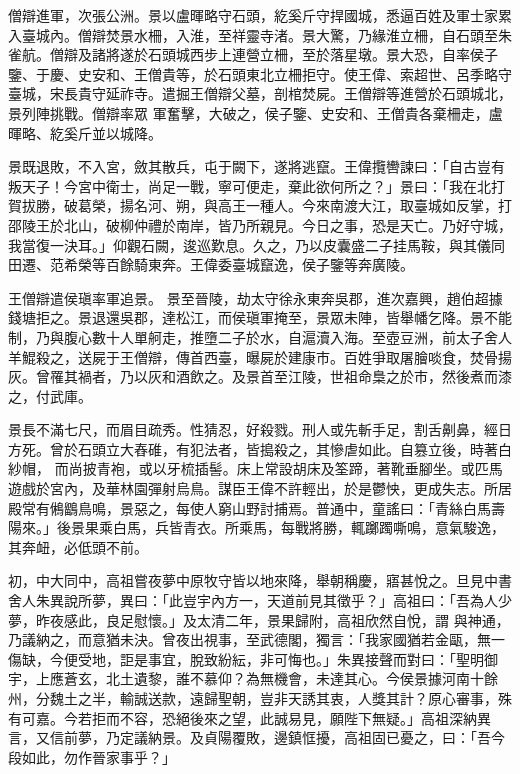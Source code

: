 \begin{pinyinscope}
 僧辯進軍，次張公洲。景以盧暉略守石頭，紇奚斤守捍國城，悉逼百姓及軍士家累入臺城內。僧辯焚景水柵，入淮，至祥靈寺渚。景大驚，乃緣淮立柵，自石頭至朱雀航。僧辯及諸將遂於石頭城西步上連營立柵，至於落星墩。景大恐，自率侯子鑒、于慶、史安和、王僧貴等，於石頭東北立柵拒守。使王偉、索超世、呂季略守臺城，宋長貴守延祚寺。遣掘王僧辯父墓，剖棺焚屍。王僧辯等進營於石頭城北，景列陣挑戰。僧辯率眾
 軍奮擊，大破之，侯子鑒、史安和、王僧貴各棄柵走，盧暉略、紇奚斤並以城降。



 景既退敗，不入宮，斂其散兵，屯于闕下，遂將逃竄。王偉攬轡諫曰：「自古豈有叛天子！今宮中衛士，尚足一戰，寧可便走，棄此欲何所之？」景曰：「我在北打賀拔勝，破葛榮，揚名河、朔，與高王一種人。今來南渡大江，取臺城如反掌，打邵陵王於北山，破柳仲禮於南岸，皆乃所親見。今日之事，恐是天亡。乃好守城，我當復一決耳。」仰觀石闕，逡巡歎息。久之，乃以皮囊盛二子挂馬鞍，與其儀同田遷、范希榮等百餘騎東奔。王偉委臺城竄逸，侯子鑒等奔廣陵。



 王僧辯遣侯瑱率軍追景。
 景至晉陵，劫太守徐永東奔吳郡，進次嘉興，趙伯超據錢塘拒之。景退還吳郡，達松江，而侯瑱軍掩至，景眾未陣，皆舉幡乞降。景不能制，乃與腹心數十人單舸走，推墮二子於水，自滬瀆入海。至壺豆洲，前太子舍人羊鯤殺之，送屍于王僧辯，傳首西臺，曝屍於建康市。百姓爭取屠膾啖食，焚骨揚灰。曾罹其禍者，乃以灰和酒飲之。及景首至江陵，世祖命梟之於市，然後煮而漆之，付武庫。



 景長不滿七尺，而眉目疏秀。性猜忍，好殺戮。刑人或先斬手足，割舌劓鼻，經日方死。曾於石頭立大舂碓，有犯法者，皆搗殺之，其慘虐如此。自篡立後，時著白紗帽，
 而尚披青袍，或以牙梳插髻。床上常設胡床及筌蹄，著靴垂腳坐。或匹馬遊戲於宮內，及華林園彈射烏鳥。謀臣王偉不許輕出，於是鬱怏，更成失志。所居殿常有鵂鶹鳥鳴，景惡之，每使人窮山野討捕焉。普通中，童謠曰：「青絲白馬壽陽來。」後景果乘白馬，兵皆青衣。所乘馬，每戰將勝，輒躑躅嘶鳴，意氣駿逸，其奔衄，必低頭不前。



 初，中大同中，高祖嘗夜夢中原牧守皆以地來降，舉朝稱慶，寤甚悅之。旦見中書舍人朱異說所夢，異曰：「此豈宇內方一，天道前見其徵乎？」高祖曰：「吾為人少夢，昨夜感此，良足慰懷。」及太清二年，景果歸附，高祖欣然自悅，謂
 與神通，乃議納之，而意猶未決。曾夜出視事，至武德閣，獨言：「我家國猶若金甌，無一傷缺，今便受地，詎是事宜，脫致紛紜，非可悔也。」朱異接聲而對曰：「聖明御宇，上應蒼玄，北土遺黎，誰不慕仰？為無機會，未達其心。今侯景據河南十餘州，分魏土之半，輸誠送款，遠歸聖朝，豈非天誘其衷，人獎其計？原心審事，殊有可嘉。今若拒而不容，恐絕後來之望，此誠易見，願陛下無疑。」高祖深納異言，又信前夢，乃定議納景。及貞陽覆敗，邊鎮恇擾，高祖固已憂之，曰：「吾今段如此，勿作晉家事乎？」




\end{pinyinscope}

